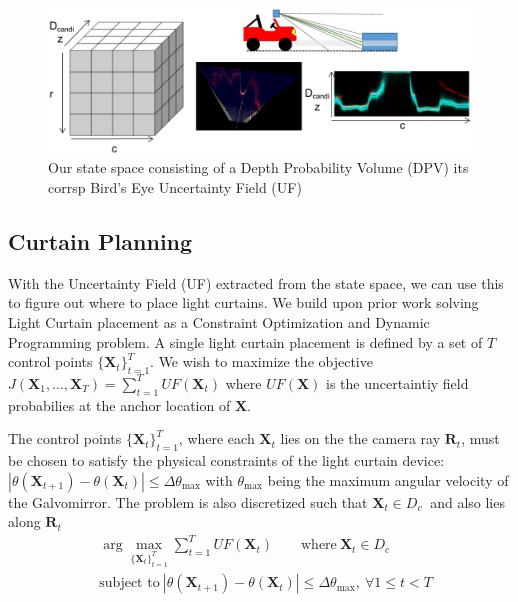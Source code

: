 \documentclass[review]{cvpr}
\newcommand{\X}{\mathbf{X}}
\newcommand{\R}{\mathbf{R}}
\newcommand{\dtmax}{\Delta \theta_\text{max}}
\begin{document}
\begin{figure}[h]
   \centering
   \begin{minipage}{0.5\textwidth}
       \centering
       \includegraphics[width=1.0\textwidth]{figures/bev.pdf}
   \end{minipage}\hfill
   \centering
   \caption{Our state space consisting of a Depth Probability Volume (DPV) its corrsp Bird's Eye Uncertainty Field (UF)}
\end{figure}

\subsection{Curtain Planning}

With the Uncertainty Field (UF) extracted from the state space, we can use this to figure out where to place light curtains. We build upon prior work solving Light Curtain placement as a Constraint Optimization and Dynamic Programming problem. A single light curtain placement is defined by a set of $T$ control points $\{\X_t\}_{t=1}^T$. We wish to maximize the objective $J(\X_1, \dots, \X_T) = \sum_{t=1}^T UF(\X_t)$ where $UF(\X)$ is the uncertaintiy field probabilies at the anchor location of $\X$.

The control points $\{\X_t\}_{t=1}^T$, where each $\X_t$ lies on the the camera ray $\R_t$, must be chosen to satisfy the physical constraints of the light curtain device: $|\theta(\X_{t+1}) - \theta(\X_t)| \leq \Delta \theta_\text{max}$ with $\theta_\text{max}$ being the maximum angular velocity of the Galvomirror. The problem is also discretized such that $\X_{t} \in D_c\ $ and also lies along $\R_t$
\begin{align}
    &\arg \max_{\{\X_t\}_{t=1}^T} \sum_{t=1}^T UF(\X_t) \qquad \text{where}\ \X_t \in D_c\ \nonumber\\
    &\text{subject to}\ |\theta(\X_{t+1}) - \theta(\X_t)| \leq \dtmax,\ \forall 1 \leq t < T
    \label{eq:constraint}
\end{align}
\end{document}
